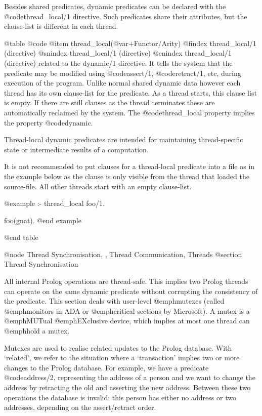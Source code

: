 {{{{{{{{{Besides shared predicates, dynamic predicates can be declared with the
@code{thread_local/1} directive. Such predicates share their
attributes, but the clause-list is different in each thread.

@table @code
@item thread_local(@var{+Functor/Arity}) 
@findex thread_local/1 (directive)
@snindex thread_local/1 (directive)
@cnindex thread_local/1 (directive)
related to the dynamic/1 directive.  It tells the system that the
predicate may be modified using @code{assert/1}, @code{retract/1},
etc, during execution of the program.  Unlike normal shared dynamic
data however each thread has its own clause-list for the predicate.
As a thread starts, this clause list is empty.  If there are still
clauses as the thread terminates these are automatically reclaimed by
the system.  The @code{thread_local} property implies
the property @code{dynamic}.

Thread-local dynamic predicates are intended for maintaining
thread-specific state or intermediate results of a computation.

It is not recommended to put clauses for a thread-local predicate into
a file as in the example below as the clause is only visible from the
thread that loaded the source-file.  All other threads start with an
empty clause-list.

@example
:- thread_local
	foo/1.

foo(gnat).
@end example

@end table


@node Thread Synchronisation, , Thread Communication, Threads
@section Thread Synchronisation

All internal Prolog operations are thread-safe. This implies two Prolog
threads can operate on the same dynamic predicate without corrupting the
consistency of the predicate. This section deals with user-level
@emph{mutexes} (called @emph{monitors} in ADA or
@emph{critical-sections} by Microsoft).  A mutex is a
@emph{MUT}ual @emph{EX}clusive device, which implies at most one thread
can @emph{hold} a mutex.

Mutexes are used to realise related updates to the Prolog database.
With `related', we refer to the situation where a `transaction' implies
two or more changes to the Prolog database.  For example, we have a
predicate @code{address/2}, representing the address of a person and we want
to change the address by retracting the old and asserting the new
address.  Between these two operations the database is invalid: this
person has either no address or two addresses, depending on the
assert/retract order.

}}}}}}}}}
